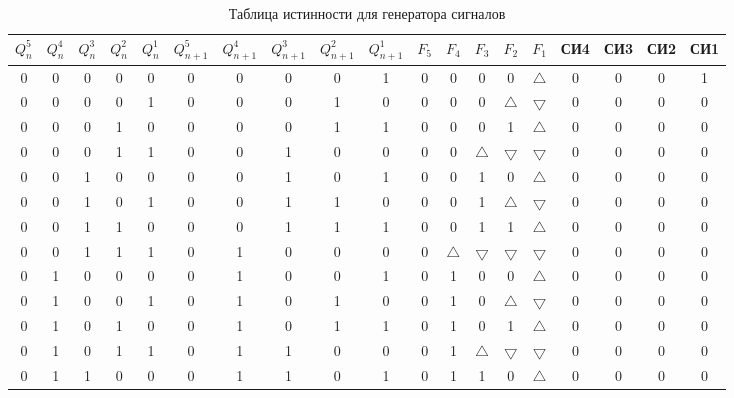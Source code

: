 \documentclass[a4paper,14pt]{article}
\begin{document}
\begin{landscape}
\begin{table}[H]
	\begin{center}
		\caption{\label{tab:rasp} Таблица истинности для генератора сигналов}

		\begin{tabular}{|c|c|c|c|c|c|c|c|c|c|c|c|c|c|c|c|c|c|c|}
			\hline
			$Q^5_n$ & $Q^4_n$ & $Q^3_n$ & $Q^2_n$ & $Q^1_n$ & $Q^5_{n+1}$ & $Q^4_{n+1}$ & $Q^3_{n+1}$ & $Q^2_{n+1}$ & $Q^1_{n+1}$ & $F_5$ & $F_4$ & $F_3$ & $F_2$ & $F_1$ & СИ4 & СИ3 & СИ2 & СИ1 \\ \hline
			0 & 0 & 0 & 0 & 0 & 0 & 0 & 0 & 0 & 1 & 0 & 0 & 0 & 0 & $\bigtriangleup$ & 0 & 0 & 0 & 1 \\ \hline
			0 & 0 & 0 & 0 & 1 & 0 & 0 & 0 & 1 & 0 & 0 & 0 & 0 & $\bigtriangleup$ & $\bigtriangledown$ & 0 & 0 & 0 & 0 \\ \hline
			0 & 0 & 0 & 1 & 0 & 0 & 0 & 0 & 1 & 1 & 0 & 0 & 0 & 1 & $\bigtriangleup$ & 0 & 0 & 0 & 0 \\ \hline
			0 & 0 & 0 & 1 & 1 & 0 & 0 & 1 & 0 & 0 & 0 & 0 & $\bigtriangleup$ & $\bigtriangledown$ & $\bigtriangledown$ & 0 & 0 & 0 & 0 \\ \hline
			0 & 0 & 1 & 0 & 0 & 0 & 0 & 1 & 0 & 1 & 0 & 0 & 1 & 0 & $\bigtriangleup$ & 0 & 0 & 0 & 0 \\ \hline
			0 & 0 & 1 & 0 & 1 & 0 & 0 & 1 & 1 & 0 & 0 & 0 & 1 & $\bigtriangleup$ & $\bigtriangledown$ & 0 & 0 & 0 & 0 \\ \hline
			0 & 0 & 1 & 1 & 0 & 0 & 0 & 1 & 1 & 1 & 0 & 0 & 1 & 1 & $\bigtriangleup$ & 0 & 0 & 0 & 0 \\ \hline
			0 & 0 & 1 & 1 & 1 & 0 & 1 & 0 & 0 & 0 & 0 & $\bigtriangleup$ & $\bigtriangledown$ & $\bigtriangledown$ & $\bigtriangledown$ & 0 & 0 & 0 & 0 \\ \hline
			0 & 1 & 0 & 0 & 0 & 0 & 1 & 0 & 0 & 1 & 0 & 1 & 0 & 0 & $\bigtriangleup$ & 0 & 0 & 0 & 0 \\ \hline
			0 & 1 & 0 & 0 & 1 & 0 & 1 & 0 & 1 & 0 & 0 & 1 & 0 & $\bigtriangleup$ & $\bigtriangledown$ & 0 & 0 & 0 & 0 \\ \hline
			0 & 1 & 0 & 1 & 0 & 0 & 1 & 0 & 1 & 1 & 0 & 1 & 0 & 1 & $\bigtriangleup$ & 0 & 0 & 0 & 0 \\ \hline
			0 & 1 & 0 & 1 & 1 & 0 & 1 & 1 & 0 & 0 & 0 & 1 & $\bigtriangleup$ & $\bigtriangledown$ & $\bigtriangledown$ & 0 & 0 & 0 & 0 \\ \hline
			0 & 1 & 1 & 0 & 0 & 0 & 1 & 1 & 0 & 1 & 0 & 1 & 1 & 0 & $\bigtriangleup$ & 0 & 0 & 0 & 0 \\ \hline

\end{tabular}
\end{center}
\end{table}
\end{landscape}
\end{document}
